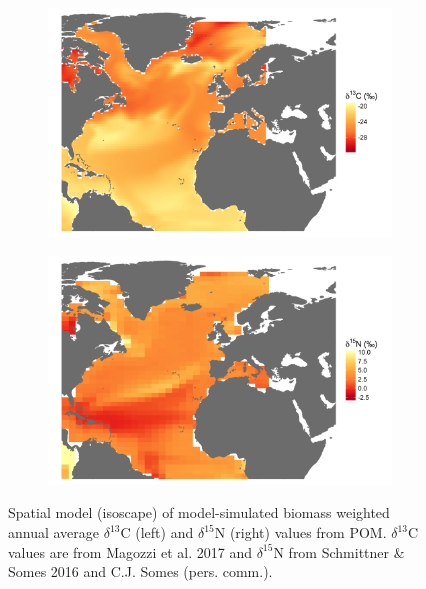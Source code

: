 \documentclass[a4paper,12pt]{article}
\begin{document}
\begin{figure}[!htbp]
    \centering
    \begin{subfigure}[t]{0.45\textwidth}
        \centering
        \includegraphics[width=\linewidth]{figures/Figure-S3-plankton-d13C-map.png} 
    \end{subfigure}
    \hfill
    \begin{subfigure}[t]{0.45\textwidth}
        \centering
        \includegraphics[width=\linewidth]{figures/Figure-S3-plankton-d15N-map.png} 
    \end{subfigure}
    \caption{Spatial model (isoscape) of model-simulated biomass weighted annual average $\delta^{13}$C (left) and $\delta^{15}$N (right) values from POM. $\delta^{13}$C values are from Magozzi et al. 2017\cite{magozzi2017using} and $\delta^{15}$N from Schmittner \& Somes 2016\cite{schmittner2016complementary} and C.J. Somes (pers. comm.).} 
    \label{figs3}
\end{figure}
\end{document}
